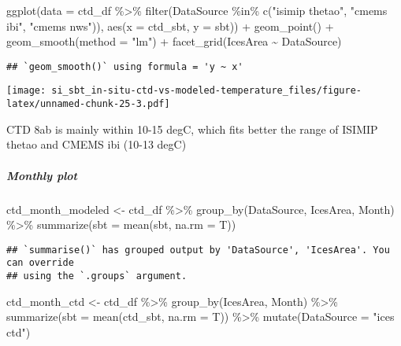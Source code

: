 \documentclass[
]{article}
\newenvironment{Shaded}{\begin{snugshade}}{\end{snugshade}}
\newcommand{\AttributeTok}[1]{\textcolor[rgb]{0.77,0.63,0.00}{#1}}
\newcommand{\FunctionTok}[1]{\textcolor[rgb]{0.00,0.00,0.00}{#1}}
\newcommand{\NormalTok}[1]{#1}
\newcommand{\OtherTok}[1]{\textcolor[rgb]{0.56,0.35,0.01}{#1}}
\newcommand{\SpecialCharTok}[1]{\textcolor[rgb]{0.00,0.00,0.00}{#1}}
\newcommand{\StringTok}[1]{\textcolor[rgb]{0.31,0.60,0.02}{#1}}
\begin{document}
\begin{Shaded}
\begin{Highlighting}[]
\FunctionTok{ggplot}\NormalTok{(}\AttributeTok{data =}\NormalTok{ ctd\_df }\SpecialCharTok{\%\textgreater{}\%} \FunctionTok{filter}\NormalTok{(DataSource }\SpecialCharTok{\%in\%} \FunctionTok{c}\NormalTok{(}\StringTok{"isimip thetao"}\NormalTok{, }\StringTok{"cmems ibi"}\NormalTok{, }\StringTok{"cmems nws"}\NormalTok{)), }\FunctionTok{aes}\NormalTok{(}\AttributeTok{x =}\NormalTok{ ctd\_sbt, }\AttributeTok{y =}\NormalTok{ sbt)) }\SpecialCharTok{+} \FunctionTok{geom\_point}\NormalTok{() }\SpecialCharTok{+} \FunctionTok{geom\_smooth}\NormalTok{(}\AttributeTok{method =} \StringTok{"lm"}\NormalTok{) }\SpecialCharTok{+} \FunctionTok{facet\_grid}\NormalTok{(IcesArea }\SpecialCharTok{\textasciitilde{}}\NormalTok{ DataSource)}
\end{Highlighting}
\end{Shaded}

\begin{verbatim}
## `geom_smooth()` using formula = 'y ~ x'
\end{verbatim}

\texttt{[image: si\_sbt\_in-situ-ctd-vs-modeled-temperature\_files/figure-latex/unnamed-chunk-25-3.pdf]}

CTD 8ab is mainly within 10-15 degC, which fits better the range of
ISIMIP thetao and CMEMS ibi (10-13 degC)

\hypertarget{monthly-plot-1}{%
\subparagraph{Monthly plot}\label{monthly-plot-1}}

\begin{Shaded}
\begin{Highlighting}[]
\NormalTok{ctd\_month\_modeled }\OtherTok{\textless{}{-}}\NormalTok{ ctd\_df }\SpecialCharTok{\%\textgreater{}\%} 
  \FunctionTok{group\_by}\NormalTok{(DataSource, IcesArea, Month) }\SpecialCharTok{\%\textgreater{}\%} 
  \FunctionTok{summarize}\NormalTok{(}\AttributeTok{sbt =} \FunctionTok{mean}\NormalTok{(sbt, }\AttributeTok{na.rm =}\NormalTok{ T))}
\end{Highlighting}
\end{Shaded}

\begin{verbatim}
## `summarise()` has grouped output by 'DataSource', 'IcesArea'. You can override
## using the `.groups` argument.
\end{verbatim}

\begin{Shaded}
\begin{Highlighting}[]
\NormalTok{ctd\_month\_ctd }\OtherTok{\textless{}{-}}\NormalTok{ ctd\_df }\SpecialCharTok{\%\textgreater{}\%} 
  \FunctionTok{group\_by}\NormalTok{(IcesArea, Month) }\SpecialCharTok{\%\textgreater{}\%}
  \FunctionTok{summarize}\NormalTok{(}\AttributeTok{sbt =} \FunctionTok{mean}\NormalTok{(ctd\_sbt, }\AttributeTok{na.rm =}\NormalTok{ T)) }\SpecialCharTok{\%\textgreater{}\%}
  \FunctionTok{mutate}\NormalTok{(}\AttributeTok{DataSource =} \StringTok{"ices ctd"}\NormalTok{)}
\end{Highlighting}
\end{Shaded}
\end{document}
